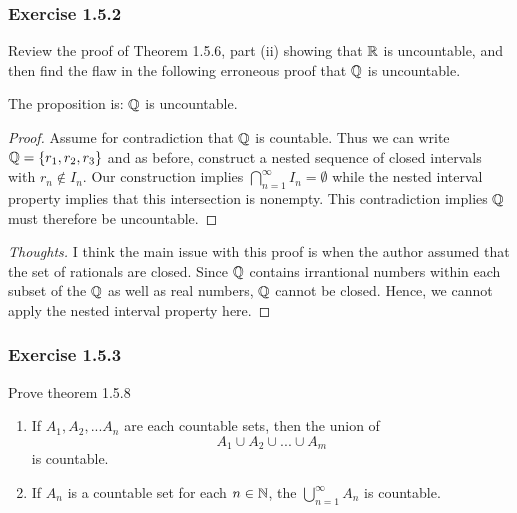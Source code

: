 \subsubsection{Exercise 1.5.2}

Review the proof of Theorem 1.5.6, part (ii) showing that \( \mathbb{R} \) is uncountable, and then find the flaw in the following erroneous proof that \( \mathbb{Q} \) is uncountable. 

The proposition is: 
\( \mathbb{Q} \) is uncountable. 

\begin{proof}
Assume for contradiction that \( \mathbb{Q} \) is countable. Thus we can write \( \mathbb{Q} = \{  r_1, r_2, r_3 \}\) and as before, construct a nested sequence of closed intervals with \( r_n \not\in I_n \). Our construction implies \( \bigcap_{n=1}^{\infty} I_n = \emptyset \) while the nested interval property implies that this intersection is nonempty. This contradiction implies \( \mathbb{Q} \) must therefore be uncountable.
\end{proof}
\begin{proof}[Thoughts]
I think the main issue with this proof is when the author assumed that the set of rationals are closed. Since \( \mathbb{Q} \) contains irrantional numbers within each subset of the \( \mathbb{Q} \) as well as real numbers, \( \mathbb{Q} \) cannot be closed.  Hence, we cannot apply the nested interval property here.  
\end{proof}


\subsubsection{Exercise 1.5.3}

Prove theorem 1.5.8



\begin{tcolorbox}
\begin{thm}
\begin{enumerate}
    \item If \( A_1, A_2,... A_n\) are each countable sets, then the union of 
        \[ A_1 \cup A_2 \cup ... \cup A_m \] is countable.
    \item If \( A_n \) is a countable set for each \( n \in \mathbb{N} \), the \( \bigcup_{n=1}^{\infty}A_n \) is countable. 
\end{enumerate}
\end{thm}
\end{tcolorbox}

